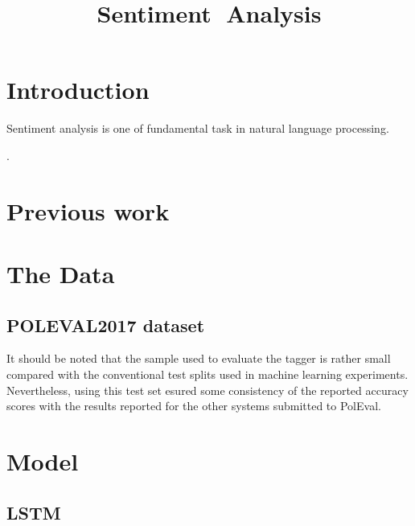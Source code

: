 \documentclass[10pt, a4paper]{article}
\title{Sentiment Analysis}
\begin{document}
\maketitleabstract

\section{Introduction}   
Sentiment analysis is one of fundamental task in natural language processing. 

\cite{de2014universal}. 

\section{Previous work}




\section{The Data}
\subsection{POLEVAL2017 dataset}


It should be noted that the sample used to evaluate the tagger is rather small compared with the conventional test splits used in machine learning experiments. Nevertheless, using this test set esured some consistency of the reported accuracy scores with the results  reported for the other systems submitted to PolEval. 

\section{Model} 


\subsection{LSTM}
\end{document}
